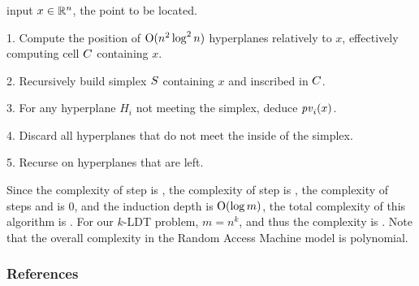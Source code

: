 \documentclass[10pt,xcolor=x11names,dvipsnames,hyperref={colorlinks=false,breaklinks=true,bookmarks=true}]{beamer}
\begin{document}
\begin{frame}\frametitle{\insertsection}\justifying
\begin{algo}
\item[input] $x \in \mathbb{R}^n$, the point to be located.
\item[1.] Compute the position of $\operatorname{O}(n^2 \log^2 n)$ hyperplanes relatively to
$x$, effectively computing cell $C$ containing $x$.
\item[2.] Recursively build simplex $S$ containing $x$ and inscribed in
$C$.
\item[3.] For any hyperplane $H_i$ not meeting the simplex, deduce $\mathit{pv}_i(x)$.
\item[4.] Discard all hyperplanes that do not meet the inside of the
simplex.
\item[5.] Recurse on hyperplanes that are left.
\end{algo}\pause

Since the complexity of step  is , the complexity of step
 is , the complexity of steps  and 
is \(0\),
and the induction depth is $\operatorname{O}(\log m)$, the total complexity of this algorithm
is . For our \(k\)-\textsf{LDT} problem, \(m = n^k\),
and thus the complexity is . Note that the overall
complexity in the Random Access Machine model is polynomial.

\end{frame}

\begin{frame}\frametitle{References}\justifying

\end{frame}
\end{document}
